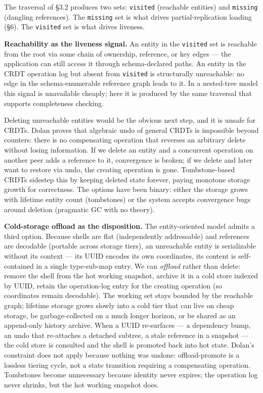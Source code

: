 The traversal of \S3.2 produces two sets: \texttt{visited} (reachable entities) and \texttt{missing} (dangling references). The \texttt{missing} set is what drives partial-replication loading (\S6). The \texttt{visited} set is what drives liveness.

\textbf{Reachability as the liveness signal.} An entity in the \texttt{visited} set is reachable from the root via some chain of ownership, reference, or key edges --- the application can still access it through schema-declared paths. An entity in the CRDT operation log but absent from \texttt{visited} is structurally unreachable: no edge in the schema-enumerable reference graph leads to it. In a nested-tree model this signal is unavailable cheaply; here it is produced by the same traversal that supports completeness checking.

Deleting unreachable entities would be the obvious next step, and it is unsafe for CRDTs. Dolan\cite{dolan2020undoable} proves that algebraic undo of general CRDTs is impossible beyond counters: there is no compensating operation that reverses an arbitrary delete without losing information. If we delete an entity and a concurrent operation on another peer adds a reference to it, convergence is broken; if we delete and later want to restore via undo, the creating operation is gone. Tombstone-based CRDTs sidestep this by keeping deleted state forever, paying monotone storage growth for correctness. The options have been binary: either the storage grows with lifetime entity count (tombstones) or the system accepts convergence bugs around deletion (pragmatic GC with no theory).

\textbf{Cold-storage offload as the disposition.} The entity-oriented model admits a third option. Because shells are flat (independently addressable) and references are decodable (portable across storage tiers), an unreachable entity is serializable without its context --- its UUID encodes its own coordinates, its content is self-contained in a single type-sub-map entry. We can \emph{offload} rather than delete: remove the shell from the hot working snapshot, archive it in a cold store indexed by UUID, retain the operation-log entry for the creating operation (so coordinates remain decodable). The working set stays bounded by the reachable graph; lifetime storage grows slowly into a cold tier that can live on cheap storage, be garbage-collected on a much longer horizon, or be shared as an append-only history archive. When a UUID re-surfaces --- a dependency bump, an undo that re-attaches a detached subtree, a stale reference in a snapshot --- the cold store is consulted and the shell is promoted back into hot state. Dolan's constraint does not apply because nothing was undone: offload-promote is a lossless tiering cycle, not a state transition requiring a compensating operation. Tombstones become unnecessary because identity never expires; the operation log never shrinks, but the hot working snapshot does.

